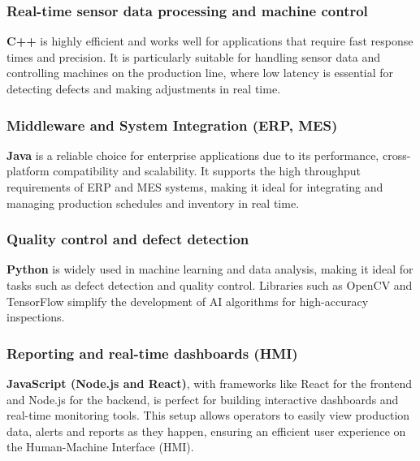 \subsubsection{Real-time sensor data processing and machine control}
\textbf{C++} is highly efficient and works well for applications that require fast response times and precision. It is particularly suitable for handling sensor data and controlling machines on the production line, where low latency is essential for detecting defects and making adjustments in real time.

\subsubsection{Middleware and System Integration (ERP, MES)}
\textbf{Java} is a reliable choice for enterprise applications due to its performance, cross-platform compatibility and scalability. It supports the high throughput requirements of ERP and MES systems, making it ideal for integrating and managing production schedules and inventory in real time.

\subsubsection{Quality control and defect detection}
\textbf{Python} is widely used in machine learning and data analysis, making it ideal for tasks such as defect detection and quality control. Libraries such as OpenCV and TensorFlow simplify the development of AI algorithms for high-accuracy inspections.

\subsubsection{Reporting and real-time dashboards (HMI)}
\textbf{JavaScript (Node.js and React)}, with frameworks like React for the frontend and Node.js for the backend, is perfect for building interactive dashboards and real-time monitoring tools. This setup allows operators to easily view production data, alerts and reports as they happen, ensuring an efficient user experience on the Human-Machine Interface (HMI).


